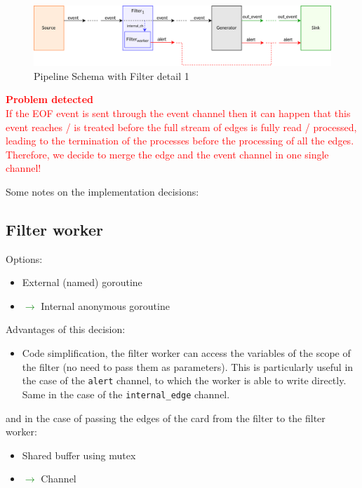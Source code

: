\documentclass{article}
\begin{document}
\begin{figure}[H]
  \centering
  \includegraphics[scale = 0.7]{images/pipeline-schema-filter-detail-1.png}
  \caption{Pipeline Schema with Filter detail 1}
  \label{img:pipeline-schema-1}
\end{figure}


\textcolor{red}{\textbf{Problem detected}\\
If the EOF event is sent through the event channel then it can happen that this event reaches / is treated before the full stream of edges is fully read / processed, leading to
the termination of the processes before the processing of all the edges.\\
Therefore, we decide to merge the edge and the event channel in one single channel!}


Some notes on the implementation decisions:

\subsection{Filter worker}

Options:

\begin{itemize}
  \item External (named) goroutine
  \item \textcolor{green}{$\rightarrow$} Internal anonymous goroutine
\end{itemize}

Advantages of this decision:
\begin{itemize}
  \item Code simplification, the filter worker can access the variables of the scope of the
  filter (no need to pass them as parameters). This is particularly useful in the case of the \texttt{alert} channel, to which the worker is able to write directly. Same in the case of the \texttt{internal\_edge} channel.
\end{itemize}

and in the case of passing the edges of the card from the filter to the filter worker:
\begin{itemize}
  \item Shared buffer using mutex
  \item \textcolor{green}{$\rightarrow$} Channel 
\end{itemize}
\end{document}
